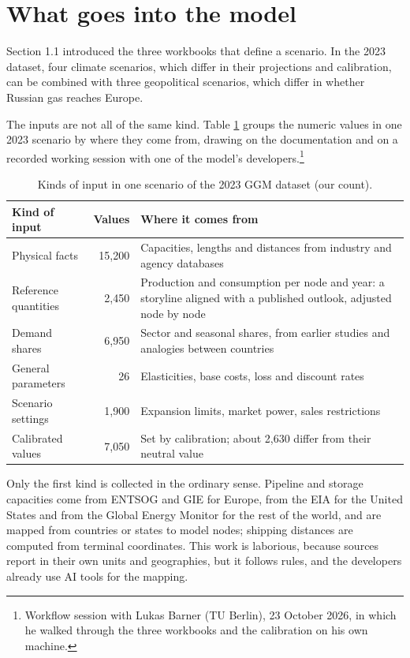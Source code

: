 \section{What goes into the model}

Section 1.1 introduced the three workbooks that define a scenario.
In the 2023 dataset, four climate scenarios, which differ in their projections and calibration, can be combined with three geopolitical scenarios, which differ in whether Russian gas reaches Europe.

The inputs are not all of the same kind.
Table \ref{tab:ggm-inputs} groups the numeric values in one 2023 scenario by where they come from, drawing on the documentation and on a recorded working session with one of the model's developers.\footnote{Workflow session with Lukas Barner (TU Berlin), 23 October 2026, in which he walked through the three workbooks and the calibration on his own machine.}

\begin{table}[htbp]
\centering
\small
\caption{Kinds of input in one scenario of the 2023 GGM dataset (our count).}
\label{tab:ggm-inputs}
\begin{tabularx}{\textwidth}{@{}lr>{\raggedright\arraybackslash}X@{}}
\toprule
\textbf{Kind of input} & \textbf{Values} & \textbf{Where it comes from} \\
\midrule
Physical facts & 15,200 & Capacities, lengths and distances from industry and agency databases \\
\tabsep
Reference quantities & 2,450 & Production and consumption per node and year: a storyline aligned with a published outlook, adjusted node by node \\
\tabsep
Demand shares & 6,950 & Sector and seasonal shares, from earlier studies and analogies between countries \\
\tabsep
General parameters & 26 & Elasticities, base costs, loss and discount rates \\
\tabsep
Scenario settings & 1,900 & Expansion limits, market power, sales restrictions \\
\tabsep
Calibrated values & 7,050 & Set by calibration; about 2,630 differ from their neutral value \\
\bottomrule
\end{tabularx}
\end{table}

Only the first kind is collected in the ordinary sense.
Pipeline and storage capacities come from ENTSOG and GIE for Europe, from the EIA for the United States and from the Global Energy Monitor for the rest of the world, and are mapped from countries or states to model nodes; shipping distances are computed from terminal coordinates.
This work is laborious, because sources report in their own units and geographies, but it follows rules, and the developers already use AI tools for the mapping.

